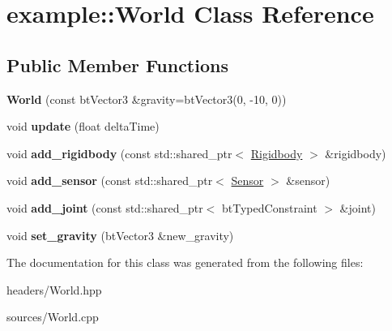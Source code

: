 \hypertarget{classexample_1_1_world}{}\section{example\+::World Class Reference}
\label{classexample_1_1_world}
\subsection*{Public Member Functions}
\begin{DoxyCompactItemize}
\item 
\mbox{\label{classexample_1_1_world_a5490e972fc296c2972fc88ed1d64df93}} 
{\bfseries World} (const bt\+Vector3 \&gravity=bt\+Vector3(0, -\/10, 0))
\item 
\mbox{\label{classexample_1_1_world_a96dd6bd53f5f518c759542d86908a358}} 
void {\bfseries update} (float delta\+Time)
\item 
\mbox{\label{classexample_1_1_world_aea57182e7ff8a2392011f406beed0e3f}} 
void {\bfseries add\+\_\+rigidbody} (const std\+::shared\+\_\+ptr$<$ \mbox{\hyperlink{classexample_1_1_rigidbody}{Rigidbody}} $>$ \&rigidbody)
\item 
\mbox{\label{classexample_1_1_world_a4a29b4a146a13600393c6bdb44c2c483}} 
void {\bfseries add\+\_\+sensor} (const std\+::shared\+\_\+ptr$<$ \mbox{\hyperlink{classexample_1_1_sensor}{Sensor}} $>$ \&sensor)
\item 
\mbox{\label{classexample_1_1_world_a9d42ac69f37c6fbce2f56407e8c08a5d}} 
void {\bfseries add\+\_\+joint} (const std\+::shared\+\_\+ptr$<$ bt\+Typed\+Constraint $>$ \&joint)
\item 
\mbox{\label{classexample_1_1_world_add63b16358b7b87c6d0f26324ba1f8e1}} 
void {\bfseries set\+\_\+gravity} (bt\+Vector3 \&new\+\_\+gravity)
\end{DoxyCompactItemize}


The documentation for this class was generated from the following files\+:\begin{DoxyCompactItemize}
\item 
headers/World.\+hpp\item 
sources/World.\+cpp\end{DoxyCompactItemize}

